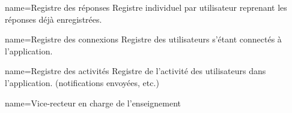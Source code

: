 	{name=Registre des réponses}
	{Registre individuel par utilisateur reprenant les réponses déjà enregistrées.}

	{name=Registre des connexions}
	{Registre des utilisateurs s'étant connectés à l'application.}

	{name=Registre des activités}
	{Registre de l'activité des utilisateurs dans l'application. (notifications envoyées, etc.)}


	{name=Vice-recteur en charge de l'enseignement}
	{}
